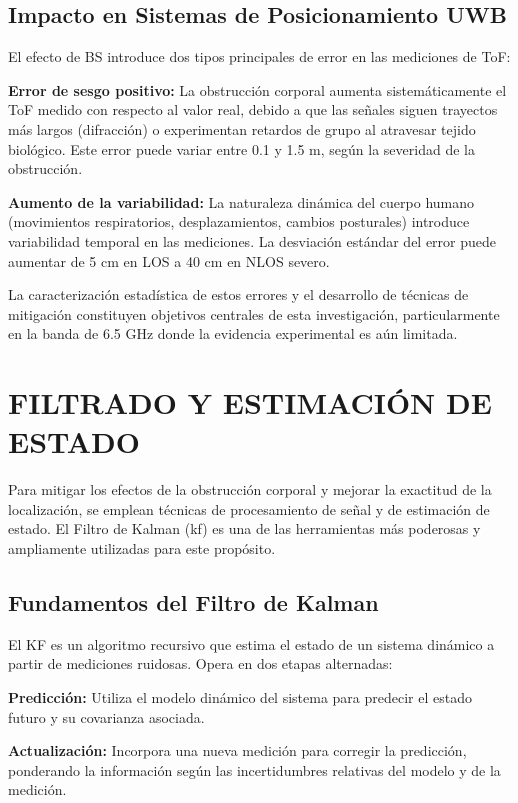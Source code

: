 \subsection{Impacto en Sistemas de Posicionamiento UWB}

El efecto de BS introduce dos tipos principales de error en las mediciones de ToF:

\textbf{Error de sesgo positivo:} La obstrucción corporal aumenta sistemáticamente el ToF medido con respecto al valor real, debido a que las señales siguen trayectos más largos (difracción) o experimentan retardos de grupo al atravesar tejido biológico. Este error puede variar entre 0.1 y 1.5 m, según la severidad de la obstrucción.

\textbf{Aumento de la variabilidad:} La naturaleza dinámica del cuerpo humano (movimientos respiratorios, desplazamientos, cambios posturales) introduce variabilidad temporal en las mediciones. La desviación estándar del error puede aumentar de 5 cm en LOS a 40 cm en NLOS severo.

La caracterización estadística de estos errores y el desarrollo de técnicas de mitigación constituyen objetivos centrales de esta investigación, particularmente en la banda de 6.5 GHz donde la evidencia experimental es aún limitada.


\section{FILTRADO Y ESTIMACIÓN DE ESTADO}
\label{sec:filtrado_kalman}

Para mitigar los efectos de la obstrucción corporal y mejorar la exactitud de la localización, se emplean técnicas de procesamiento de señal y de estimación de estado. El Filtro de Kalman (\gls{kf}) es una de las herramientas más poderosas y ampliamente utilizadas para este propósito.

\subsection{Fundamentos del Filtro de Kalman}

El KF es un algoritmo recursivo que estima el estado de un sistema dinámico a partir de mediciones ruidosas. Opera en dos etapas alternadas:

\textbf{Predicción:} Utiliza el modelo dinámico del sistema para predecir el estado futuro y su covarianza asociada.

\textbf{Actualización:} Incorpora una nueva medición para corregir la predicción, ponderando la información según las incertidumbres relativas del modelo y de la medición.

